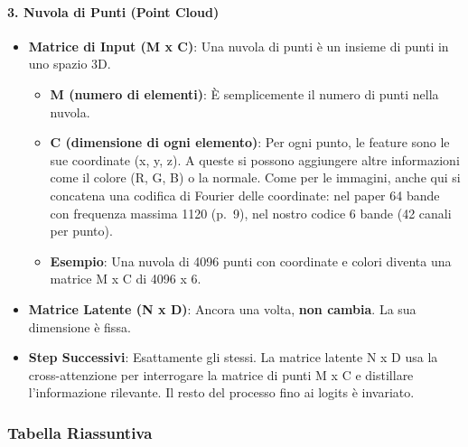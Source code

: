 \documentclass[
  11pt,
]{article}
\begin{document}
\paragraph{\texorpdfstring{\textbf{3. Nuvola di Punti (Point
Cloud)}}{3. Nuvola di Punti (Point Cloud)}}\label{nuvola-di-punti-point-cloud}

\begin{itemize}
\item
  \textbf{Matrice di Input (M x C)}: Una nuvola di punti è un insieme di
  punti in uno spazio 3D.

\begin{itemize}
  \item
    \textbf{M (numero di elementi)}: È semplicemente il numero di punti
    nella nuvola.
  \item
    \textbf{C (dimensione di ogni elemento)}: Per ogni punto, le feature
    sono le sue coordinate (x, y, z). A queste si possono aggiungere
    altre informazioni come il colore (R, G, B) o la normale. Come per
    le immagini, anche qui si concatena una codifica di Fourier delle
    coordinate: nel paper 64 bande con frequenza massima 1120 (p.~9),
    nel nostro codice 6 bande (42 canali per punto).
  \item
    \textbf{Esempio}: Una nuvola di 4096 punti con coordinate e colori
    diventa una matrice M x C di 4096 x 6.
  \end{itemize}
\item
  \textbf{Matrice Latente (N x D)}: Ancora una volta, \textbf{non
  cambia}. La sua dimensione è fissa.
\item
  \textbf{Step Successivi}: Esattamente gli stessi. La matrice latente N
  x D usa la cross-attenzione per interrogare la matrice di punti M x C
  e distillare l'informazione rilevante. Il resto del
  processo fino ai logits è invariato.
\end{itemize}

\subsubsection{\texorpdfstring{\textbf{Tabella
Riassuntiva}}{Tabella Riassuntiva}}\label{tabella-riassuntiva}
\end{document}
